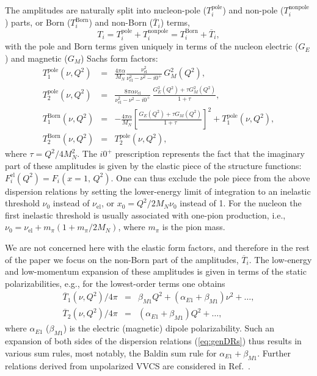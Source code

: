 \documentclass[12pt,preprint,tightenlines,
showpacs,preprintnumbers,amsmath,amssymb,
a4paper,nofootinbib]{revtex4-2}
\def\beq{\begin{equation}}
\def\eeq{\end{equation}}
\def\bea{\begin{eqnarray}}
\def\eea{\end{eqnarray}}
\def\eref#1{(\ref{eq:#1})}
\def\al{\alpha}
\def\ol#1{\overline{#1}}
\begin{document}
The amplitudes are naturally split into nucleon-pole ($T_i^{\mathrm{pole}}$) and non-pole ($T_i^{\mathrm{nonpole}}$)
parts, or Born ($T_i^{\mathrm{Born}}$) and non-Born ($\ol T_i$) terms,
\beq
T_i = T_i^{\mathrm{pole}} + T_i^{\mathrm{nonpole}}
= T_i^{\mathrm{Born}} + \ol T_i,
\eeq 
with the pole and Born terms given uniquely in terms
of the nucleon electric ($G_E$) and magnetic ($G_M$) Sachs form factors:
\begin{subequations}
\bea
T_1^{\mathrm{pole}}   (\nu,Q^2) &=& \frac{4\pi \al}{M_N}
\frac{\nu_\mathrm{el}^2}{\nu_\mathrm{el}^2-\nu^2-i0^+}\, G_M^2(Q^2), \\
 T_2^{\mathrm{pole}}(\nu,Q^2) &=& \frac{8\pi \al\nu_\mathrm{el}}{\nu_\mathrm{el}^2-\nu^2-i0^+}\, \frac{G_E^2(Q^2)+\tau G_M^2(Q^2)}{1+\tau}, \\
T_1^{\mathrm{Born}}(\nu, Q^2) &=& -\frac{4\pi \alpha}{M_N}\left[\frac{G_E(Q^2)+\tau G_M (Q^2)}{1+\tau}\right]^2+T_1^{\mathrm{pole}}(\nu, Q^2),\\ 
T_2^{\mathrm{Born}}(\nu, Q^2) &=& T_2^{\mathrm{pole}}(\nu, Q^2),
\eea
\end{subequations}
where $\tau = Q^2/4 M_N^2$. The $i0^+$ prescription represents the fact that the imaginary part of these amplitudes is given by
the elastic piece of the structure functions: $F_i^{\mathrm{el}}(Q^2) = F_i(x=1, \, Q^2)$. One can thus
exclude the pole piece from the above dispersion relations
by setting the lower-energy limit of integration to an inelastic threshold $\nu_0$ instead of $\nu_\mathrm{el}$, 
or $x_0 = Q^2/2M_N\nu_0$ instead of 1. 
For the nucleon the first inelastic
threshold is usually associated with one-pion production, i.e.,
$\nu_0 = \nu_\mathrm{el}+ m_\pi (1 + m_\pi/2M_N) $, where $m_\pi$ is the pion mass.

We are not concerned here with the elastic form factors, and therefore in the rest of the paper we focus on the non-Born part
of the amplitudes,  $\ol T_i$. The low-energy and low-momentum expansion
of these amplitudes is given in terms of the static polarizabilities, e.g., for the lowest-order terms one obtains
\begin{subequations}
\bea 
\ol T_1(\nu, Q^2)/4\pi  &=& \beta_{M1} Q^2 + (\alpha_{E1} + \beta_{M1}) \nu^2 + \ldots, \\
\ol T_2(\nu, Q^2)/4\pi  &=&  (\alpha_{E1} + \beta_{M1}) Q^2 + \ldots,
\eea 
\end{subequations}
where $\alpha_{E1}$ ($\beta_{M1}$) is  the  electric (magnetic) dipole
polarizability.
Such an expansion of both sides of the dispersion relations \eref{genDRs} thus results in various sum rules, most notably, the Baldin sum rule \cite{Baldin:1960} for 
 $\alpha_{E1} + \beta_{M1}$. Further relations derived from unpolarized VVCS are considered in Ref.~\cite{Lensky:2017bwi}.
 
\end{document}
